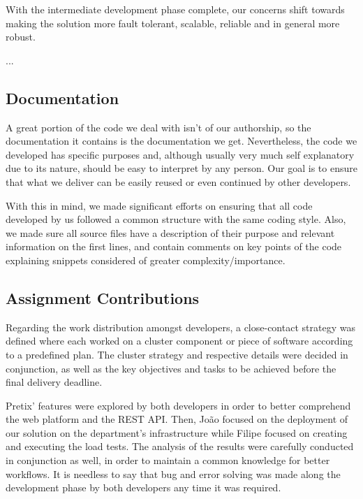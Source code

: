 \documentclass[12pt]{article}
\begin{document}

With the intermediate development phase complete, our concerns shift towards making the solution more fault tolerant, scalable, reliable and in general more robust.

...

\subsection{Documentation} \label{remarks.documentation} %


A great portion of the code we deal with isn't of our authorship, so the documentation it contains is the documentation we get.
Nevertheless, the code we developed has specific purposes and, although usually very much self explanatory due to its nature, should be easy to interpret by any person.
Our goal is to ensure that what we deliver can be easily reused or even continued by other developers.

With this in mind, we made significant efforts on ensuring that all code developed by us followed a common structure with the same coding style.
Also, we made sure all source files have a description of their purpose and relevant information on the first lines, and contain comments on key points of the 
code explaining snippets considered of greater complexity/importance.

\subsection{Assignment Contributions} \label{remarks.contributions} %


Regarding the work distribution amongst developers, a close-contact strategy was defined where each worked on a cluster component or piece of software according 
to a predefined plan. 
The cluster strategy and respective details were decided in conjunction, as well as the key objectives and tasks to be achieved before the final delivery deadline.

Pretix' features were explored by both developers in order to better comprehend the web platform and the REST API.
Then, João focused on the deployment of our solution on the department's infrastructure while Filipe focused on creating and executing the load tests.
The analysis of the results were carefully conducted in conjunction as well, in order to maintain a common knowledge for better workflows.
It is needless to say that bug and error solving was made along the development phase by both developers any time it was required.
\end{document}
